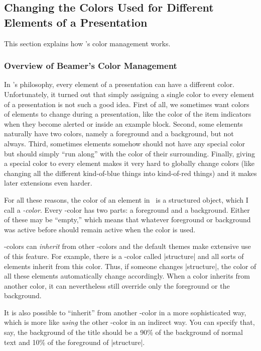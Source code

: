 \subsection{Changing the Colors Used for Different Elements of a Presentation}

This section explains how \beamer's color management works.



\subsubsection{Overview of Beamer's Color Management}

In \beamer's philosophy, every element of a presentation can have a
different color. Unfortunately, it turned out that simply assigning a
single color to every element of a presentation is not such a good
idea. First of all, we sometimes  want colors of elements to change
during a presentation, like the color of the item indicators when they
become alerted or inside an example block. Second, some elements
naturally have two colors, namely a foreground and a background, but
not always. Third, sometimes elements somehow should not have any
special color but should simply ``run along'' with the color of their
surrounding. Finally, giving a special color to every element makes it
very hard to globally change colors (like changing all the different
kind-of-blue things into kind-of-red things) and it makes later
extensions even harder.

For all these reasons, the color of an element in \beamer\ is a
structured object, which I call a \emph{\beamer-color}. Every
\beamer-color has two parts: a foreground and a background. Either of
these may be ``empty,'' which means that whatever foreground or
background was active before should remain active when the color is
used.

\beamer-colors can \emph{inherit} from other \beamer-colors and the
default themes make extensive use of this feature. For example, there
is a \beamer-color called |structure| and all sorts of elements
inherit from this color. Thus, if someone changes |structure|, the
color of all these elements automatically change accordingly. When a
color inherits from another color, it can nevertheless still override
only the foreground or the background.

It is also possible to ``inherit'' from another \beamer-color in a more
sophisticated way, which is more like \emph{using} the other
\beamer-color in an indirect way. You can specify that, say, the
background of the title should be a 90\% of the background of normal
text and 10\% of the foreground of |structure|.

